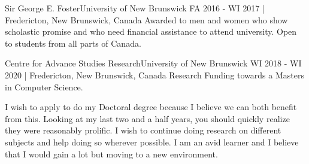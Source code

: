 \documentclass[english,letterpaper,12pt]{deedy-resume-openfont}
\begin{document}


    \employement%
        {Sir George E. Foster}{University of New Brunswick}
        {FA 2016 - WI 2017  | Fredericton, New Brunswick, Canada}{%
        Awarded to men and women who show scholastic promise and who need financial assistance to attend university. 
        Open to students from all parts of Canada.
        }

    \employement%
        {Centre for Advance Studies Research}{University of New Brunswick}
        {WI 2018 - WI 2020   | Fredericton, New Brunswick, Canada}{%
        Research Funding towards a Masters in Computer Science.
        }








\clearpage

\doublespacing

\vspace*{20pt}



I wish to apply to do my Doctoral degree because I believe we can both benefit from this.
Looking at my last two and a half years, you should quickly realize they were reasonably prolific.
I wish to continue doing research on different subjects and help doing so wherever possible.
I am an avid learner and I believe that I would gain a lot but moving to a new environment.
\end{document}
